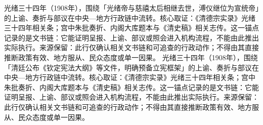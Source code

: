 光绪三十四年（1908年），围绕「光绪帝与慈禧太后相继去世，溥仪继位为宣统帝」的上谕、奏折与部议在中央—地方行政链中流转。核心取证：《清德宗实录》光绪三十四年相关条；宫中朱批奏折、内阁大库题本与《清史稿》相关志传。这一锚点记录的是文书链：它能证明呈报、上谕、部议或照会进入机构流程，不能由此推出实际执行。来源保留：此行仅确认相关文书链和可追查的行政动作；不得由其直接推断政策有效、地方服从、民众态度或单一因果。
光绪三十四年（1908年），围绕「清廷公布《钦定宪法大纲》等文件，明确预备立宪框架」的上谕、奏折与部议在中央—地方行政链中流转。核心取证：《清德宗实录》光绪三十四年相关条；宫中朱批奏折、内阁大库题本与《清史稿》相关志传。这一锚点记录的是文书链：它能证明呈报、上谕、部议或照会进入机构流程，不能由此推出实际执行。来源保留：此行仅确认相关文书链和可追查的行政动作；不得由其直接推断政策有效、地方服从、民众态度或单一因果。
